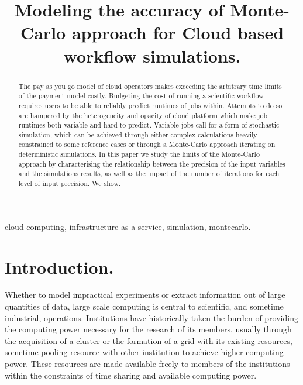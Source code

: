\documentclass[10pt,conference,compsocconf]{IEEEtran}
\title{Modeling the accuracy of Monte-Carlo approach for Cloud based workflow simulations.}
\author{\IEEEauthorblockN{Luke~Bertot 
			and Stéphane~Genaud 
			and Julien~Gossa}
	\IEEEauthorblockA{Icube-ICPS --- UMR 7357, Univeristé de Strasbourg, CNRS\\
		P\^ole API Blvd S. Bant, 67400 Illkirch\\
		email: \url{lbertot@unistra.fr}, \url{gossa@unistra.fr}, \url{genaud@unistra.fr}}
	}
\begin{document}
\maketitle

\begin{abstract}
  The pay as you go model of  cloud operators makes exceeding the arbitrary time
  limits of the payment model costly. Budgeting the cost of running a scientific
  workflow  requires users  to  be able  to reliably  predict  runtimes of  jobs
  within. Attempts  to do so  are hampered by  the heterogeneity and  opacity of
  cloud  platform   which  make   job  runtimes  both   variable  and   hard  to
  predict. Variable jobs call for a  form of stochastic simulation, which can be
  achieved  through  either complex  calculations  heavily  constrained to  some
  reference cases or  through a Monte-Carlo approach  iterating on deterministic
  simulations. In this paper we study  the limits of the Monte-Carlo approach by
  characterising the relationship  between the precision of  the input variables
  and the simulations results, as well as the impact of the number of iterations
  for each level of input precision. We show.
\end{abstract}

\begin{IEEEkeywords}
cloud computing, infrastructure as a service, simulation, montecarlo.
\end{IEEEkeywords}

\section{Introduction.}

Whether to  model impractical  experiments or extract  information out  of large
quantities of data, large scale computing is central to scientific, and sometime
industrial,  operations.  Institutions  have  historically taken  the burden  of
providing the computing power necessary for the research of its members, usually
through  the acquisition  of a  cluster  or the  formation  of a  grid with  its
existing resources, sometime pooling resource  with other institution to achieve
higher computing power.  These resources are made available freely to members of
the institutions within the constraints  of time sharing and available computing
power.
\end{document}
